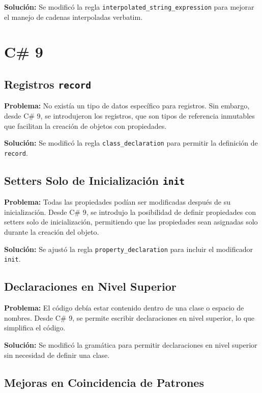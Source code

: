 \textbf{Solución:} Se modificó la regla \texttt{interpolated\_string\_expression} para mejorar el manejo de cadenas interpoladas verbatim.



\section{C\# 9}

\subsection*{Registros \texttt{record}}

\textbf{Problema:} No existía un tipo de datos específico para registros. Sin embargo, desde C\# 9, se introdujeron los registros, que son tipos de referencia inmutables que facilitan la creación de objetos con propiedades.

\textbf{Solución:} Se modificó la regla \texttt{class\_declaration} para permitir la definición de \texttt{record}.

\subsection*{Setters Solo de Inicialización \texttt{init}}

\textbf{Problema:} Todas las propiedades podían ser modificadas después de su inicialización. Desde C\# 9, se introdujo la posibilidad de definir propiedades con setters solo de inicialización, permitiendo que las propiedades sean asignadas solo durante la creación del objeto.

\textbf{Solución:} Se ajustó la regla \texttt{property\_declaration} para incluir el modificador \texttt{init}.

\subsection*{Declaraciones en Nivel Superior}

\textbf{Problema:} El código debía estar contenido dentro de una clase o espacio de nombres. Desde C\# 9, se permite escribir declaraciones en nivel superior, lo que simplifica el código.

\textbf{Solución:} Se modificó la gramática para permitir declaraciones en nivel superior sin necesidad de definir una clase.

\subsection*{Mejoras en Coincidencia de Patrones}

